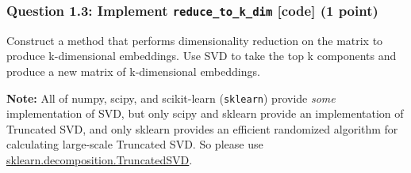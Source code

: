 \documentclass[11pt]{article}
\begin{document}
    \subsubsection{\texorpdfstring{Question 1.3: Implement
\texttt{reduce\_to\_k\_dim} {[}code{]} (1
point)}{Question 1.3: Implement reduce\_to\_k\_dim {[}code{]} (1 point)}}\label{question-1.3-implement-reduce_to_k_dim-code-1-point}

Construct a method that performs dimensionality reduction on the matrix
to produce k-dimensional embeddings. Use SVD to take the top k
components and produce a new matrix of k-dimensional embeddings.

\textbf{Note:} All of numpy, scipy, and scikit-learn (\texttt{sklearn})
provide \emph{some} implementation of SVD, but only scipy and sklearn
provide an implementation of Truncated SVD, and only sklearn provides an
efficient randomized algorithm for calculating large-scale Truncated
SVD. So please use
\href{https://scikit-learn.org/stable/modules/generated/sklearn.decomposition.TruncatedSVD.html}{sklearn.decomposition.TruncatedSVD}.
\end{document}

